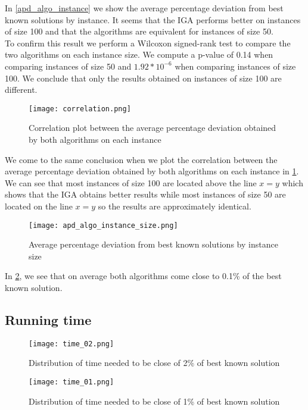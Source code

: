 \documentclass[a4paper,10pt]{article}
\begin{document}
		In \ref{apd_algo_instance} we show the average percentage deviation from best known solutions by instance. It seems that the IGA performs better on instances of size 100 and that the algorithms are equivalent for instances of size 50. \\
		To confirm this result we perform a Wilcoxon signed-rank test to compare the two algorithms on each instance size. We compute a p-value of 0.14 when comparing instances of size 50 and $1.92 * 10^{-6}$ when comparing instances of size 100. We conclude that only the results obtained on instances of size 100 are different.

		\begin{figure}[H]
			\centering
			\label{correlation}
			\caption{Correlation plot between the average percentage deviation obtained by both algorithms on each instance}
			\texttt{[image: correlation.png]}
		\end{figure}

		We come to the same conclusion when we plot the correlation between the average percentage deviation obtained by both algorithms on each instance in \ref{correlation}. We can see that most instances of size 100 are located above the line $x = y$ which shows that the IGA obtains better results while most instances of size 50 are located on the line $x = y$ so the results are approximately identical.


		\begin{figure}[H]
			\centering
			\label{apd_algo_instance_size}
			\caption{Average percentage deviation from best known solutions by instance size}
			\texttt{[image: apd\_algo\_instance\_size.png]}
		\end{figure}

		In \ref{apd_algo_instance_size}, we see that on average both algorithms come close to 0.1\% of the best known solution.

	\subsection{Running time}

	\begin{figure}[H]
		\centering
		\caption{Distribution of time needed to be close of 2\% of best known solution}
		\texttt{[image: time\_02.png]}
	\end{figure}

	\begin{figure}[H]
		\centering
		\caption{Distribution of time needed to be close of 1\% of best known solution}
		\texttt{[image: time\_01.png]}
	\end{figure}
\end{document}
